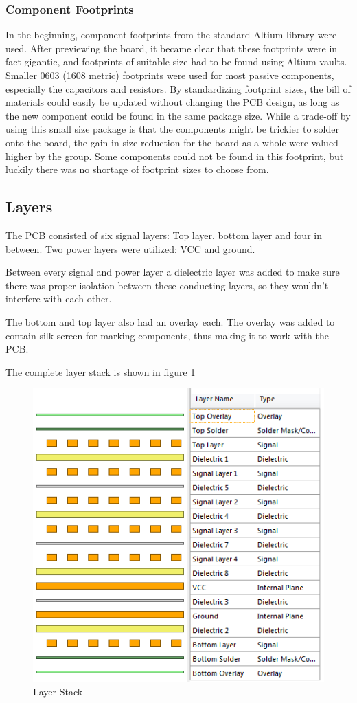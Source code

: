\begin{itemize}
\subsubsection{Component Footprints}
In the beginning, component footprints from the standard Altium library were used.
After previewing the board, it became clear that these footprints were in fact gigantic, and footprints of suitable size had to be found using Altium vaults.
Smaller 0603 (1608 metric) footprints were used for most passive components, especially the capacitors and resistors.
By standardizing footprint sizes, the bill of materials could easily be updated without changing the PCB design, as long as the new component could be found in the same package size.
While a trade-off by using this small size package is that the components might be trickier to solder onto the board, the gain in size reduction for the board as a whole were valued higher by the group.
Some components could not be found in this footprint, but luckily there was no shortage of footprint sizes to choose from.


\subsection{Layers}
The PCB consisted of six signal layers: Top layer, bottom layer and four in between.
Two power layers were utilized: VCC and ground.

Between every signal and power layer a dielectric layer was added to make sure there was proper isolation between these conducting layers, so they wouldn't interfere with each other.

The bottom and top layer also had an overlay each.
The overlay was added to contain silk-screen for marking components, thus making it to work with the PCB.

The complete layer stack is shown in figure \ref{fig:Layers}

\begin{figure}[h!]
\centering
\includegraphics[scale = 0.8]{images/Layers.png}
\caption{Layer Stack}
\label{fig:Layers}
\end{figure}


\end{itemize}
